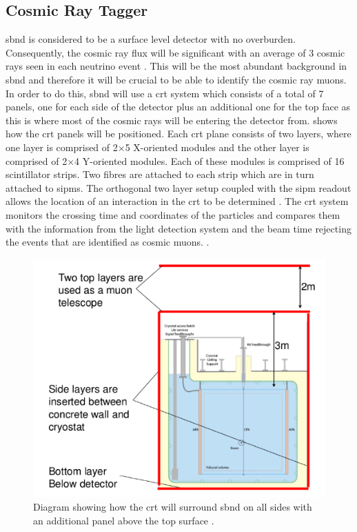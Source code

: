 \subsection*{Cosmic Ray Tagger}

\gls{sbnd} is considered to be a surface level detector with no overburden. Consequently, the cosmic ray flux will be significant with an average of 3 cosmic rays seen in each neutrino event \cite{SBN_Proposal}. This will be the most abundant background in \gls{sbnd} and therefore it will be crucial to be able to identify the cosmic ray muons. In order to do this, \gls{sbnd} will use a \gls{crt} system which consists of a total of 7 panels, one for each side of the detector plus an additional one for the top face as this is where most of the cosmic rays will be entering the detector from.  shows how the \gls{crt} panels will be positioned. Each \gls{crt} plane consists of two layers, where one layer is comprised of 2$\times$5 X-oriented modules and the other layer is comprised of 2$\times$4 Y-oriented modules. Each of these modules is comprised of 16 scintillator strips. Two fibres are attached to each strip which are in turn attached to \glspl{sipm}. The orthogonal two layer setup coupled with the \gls{sipm} readout allows the location of an interaction in the \gls{crt} to be determined \cite{sbnd_crt}. The \gls{crt} system monitors the crossing time and coordinates of the particles and compares them with the information from the light detection system and the beam time rejecting the events that are identified as cosmic muons. \cite{microboone_crt}.

\begin{figure}[!h]
    \centering
    \includegraphics[width = \largefigwidth]{figures-chap3/SBND_CRT.png}
    \caption[CRT positioning in SBND.]{Diagram showing how the \gls{crt} will surround \gls{sbnd} on all sides with an additional panel above the top surface \cite{SBN_Proposal}.}
    \label{fig:sbnd_crt}
\end{figure}

